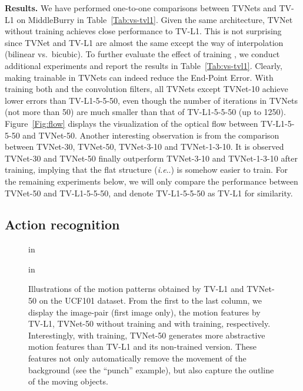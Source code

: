 \documentclass[10pt,twocolumn,letterpaper]{article}
\makeatletter
\DeclareRobustCommand\onedot{\futurelet\@let@token\@onedot}
\def\@onedot{\ifx\@let@token.\else.\null\fi\xspace}
\def\ie{\emph{i.e}\onedot} \def\Ie{\emph{I.e}\onedot}
\makeatother
\begin{document}
\textbf{Results.}
We have performed one-to-one comparisons between TVNets and TV-L1 on MiddleBurry in Table~\ref{Tab:vs-tvl1}. Given the same architecture, TVNet without training achieves close performance to TV-L1. This is not surprising since TVNet and TV-L1 are almost the same except the way of interpolation (bilinear vs.\ bicubic). To further evaluate the effect of training , we conduct additional experiments and report the results in Table~\ref{Tab:vs-tvl1}. Clearly, making  trainable in TVNets can indeed reduce the End-Point Error.
With training both  and the convolution filters, all TVNets except TVNet-10 achieve lower errors than TV-L1-5-5-50, even though the number of iterations in TVNets (not more than 50) are much smaller than that of TV-L1-5-5-50 (up to 1250).
Figure~\ref{Fig:flow} displays the visualization of the optical flow between TV-L1-5-5-50 and TVNet-50.
Another interesting observation is from the comparison between  TVNet-30, TVNet-50, TVNet-3-10 and TVNet-1-3-10. It is observed TVNet-30 and TVNet-50 finally outperform TVNet-3-10 and TVNet-1-3-10 after training,  implying that the flat structure (\ie ) is somehow easier to train.
For the remaining experiments below, we will only compare the performance between TVNet-50 and TV-L1-5-5-50, and denote TV-L1-5-5-50 as TV-L1 for similarity.







\subsection{Action recognition}


\begin{figure*}[th!]
\begin{center}
 in
\caption{Illustrations of the motion patterns obtained by TV-L1 and TVNet-50 on the UCF101 dataset. From the first to the last column, we display the image-pair (first image only), the motion features by TV-L1, TVNet-50 without training and with training, respectively. Interestingly, with training, TVNet-50 generates more abstractive motion features than TV-L1 and its non-trained version. These features not only automatically remove the movement of the background (see the ``punch'' example), but also capture the outline of the moving objects.}
\label{Fig:representation}
\end{center}
 in
\end{figure*}
\end{document}
